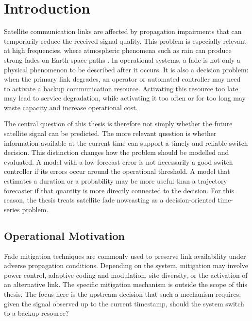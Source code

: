 \chapter{Introduction}
\label{chap:introduction}

Satellite communication links are affected by propagation impairments that can
temporarily reduce the received signal quality. This problem is especially
relevant at high frequencies, where atmospheric phenomena such as rain can
produce strong fades on Earth-space paths \cite{panagopoulos2004satellite,
iturP618}. In operational systems, a fade is not only a physical phenomenon to
be described after it occurs. It is also a decision problem: when the primary
link degrades, an operator or automated controller may need to activate a
backup communication resource. Activating this resource too late may lead to
service degradation, while activating it too often or for too long may waste
capacity and increase operational cost.

The central question of this thesis is therefore not simply whether the future
satellite signal can be predicted. The more relevant question is whether
information available at the current time can support a timely and reliable
switch decision. This distinction changes how the problem should be modelled
and evaluated. A model with a low forecast error is not necessarily a good
switch controller if its errors occur around the operational threshold. A
model that estimates a duration or a probability may be more useful than a
trajectory forecaster if that quantity is more directly connected to the
decision. For this reason, the thesis treats satellite fade nowcasting as a
decision-oriented time-series problem.

\section{Operational Motivation}
\label{sec:introduction-operational-motivation}

Fade mitigation techniques are commonly used to preserve link availability
under adverse propagation conditions. Depending on the system, mitigation may
involve power control, adaptive coding and modulation, site diversity, or the
activation of an alternative link. The specific mitigation mechanism is outside
the scope of this thesis. The focus here is the upstream decision that such a
mechanism requires: given the signal observed up to the current timestamp,
should the system switch to a backup resource?

